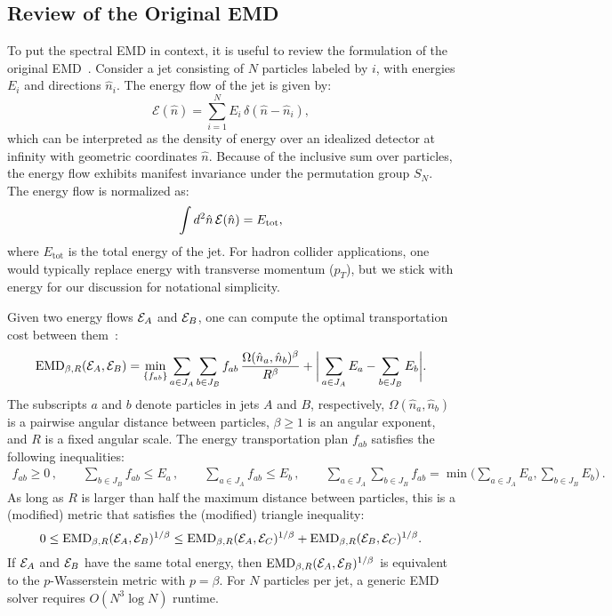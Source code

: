 \documentclass[letterpaper,11pt]{article}
\begin{document}
\subsection{Review of the Original EMD}
\label{sec:originalEMD}

To put the spectral EMD in context, it is useful to review the formulation of the original EMD~\cite{Komiske:2019fks}.
%
Consider a jet consisting of $N$ particles labeled by $i$, with energies $E_i$ and directions $\hat{n}_i$.
%
The energy flow of the jet is given by:
%
\begin{equation}
\label{eq:energyflow}
\mathcal{E}(\hat{n}) = \sum_{i=1}^N E_i \, \delta(\hat{n} - \hat{n}_i),
\end{equation}
%
which can be interpreted as the density of energy over an idealized detector at infinity with geometric coordinates $\hat{n}$.
%
Because of the inclusive sum over particles, the energy flow exhibits manifest invariance under the permutation group $S_N$.
%
The energy flow is normalized as:
%
\begin{equation}
\int d^2 \hat{n} \, \mathcal{E}(\hat{n}) = E_{\rm tot},
\end{equation}
%
where $E_\text{tot}$ is the total energy of the jet.
%
For hadron collider applications, one would typically replace energy with transverse momentum ($p_T$), but we stick with energy for our discussion for notational simplicity.


Given two energy flows ${\cal E}_A$ and ${\cal E}_B$, one can compute the optimal transportation cost between them~\cite{Komiske:2019fks}:
%
\begin{align}
\label{eq:original_EMD}
\text{EMD}_{\beta,R}({\cal E}_A,{\cal E}_B) = \min_{\{f_{ab}\}} \sum_{a \in J_A} \sum_{b \in J_B} f_{ab}\, \frac{\Omega(\hat{n}_a,\hat{n}_b)^\beta}{R^\beta} + \bigg| \sum_{a \in J_A} E_a - \sum_{b \in J_B} E_b  \bigg| .
\end{align}
%
The subscripts $a$ and $b$ denote particles in jets $A$ and $B$, respectively, $\Omega(\hat{n}_a,\hat{n}_b)$ is a pairwise angular distance between particles, $\beta \ge 1$ is an angular exponent, and $R$ is a fixed angular scale.
%
The energy transportation plan $f_{ab}$ satisfies the following inequalities:
%
\begin{align}
\label{eq:original_EMD_constraints}
f_{ab}\geq 0\,,\qquad \sum_{b \in J_B}f_{ab}\leq E_a\,,\qquad \sum_{a \in J_A}f_{ab}\leq E_b\,,\qquad \sum_{a \in J_A} \sum_{b \in J_B} f_{ab} = \min \Big(\sum_{a \in J_A} E_a, \sum_{b \in J_B} E_b \Big) \,.
\end{align}
%
As long as $R$ is larger than half the maximum distance between particles, this is a (modified) metric that satisfies the (modified) triangle inequality:
%
\begin{equation}
0 \le \text{EMD}_{\beta,R}({\cal E}_A,{\cal E}_B)^{1/\beta} \le \text{EMD}_{\beta,R}({\cal E}_A,{\cal E}_C)^{1/\beta} + \text{EMD}_{\beta,R}({\cal E}_B,{\cal E}_C)^{1/\beta}.
\end{equation}
%
If ${\cal E}_A$ and ${\cal E}_B$ have the same total energy, then $\text{EMD}_{\beta,R}({\cal E}_A,{\cal E}_B)^{1/\beta}$ is equivalent to the $p$-Wasserstein metric with $p = \beta$.
%
For $N$ particles per jet, a generic EMD solver requires $O(N^3 \log N)$ runtime.
\end{document}
